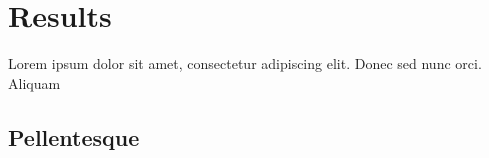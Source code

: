 \chapter{Results}
\label{cha:results}
Lorem ipsum dolor sit amet, consectetur adipiscing elit. Donec sed nunc orci. Aliquam

\section{Pellentesque}
\label{sec:564}
